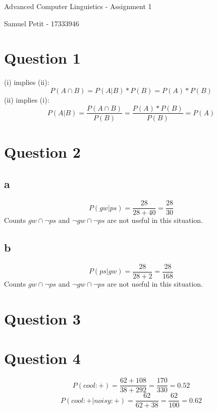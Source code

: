 \documentclass[10pt]{article}
\begin{document}
{\centering
    Advanced Computer Linguistics - Assignment 1
    \par
    Samuel Petit - 17333946
    \par
}
\section*{Question 1}
(i) implies (ii):
\begin{equation*}
    P(A \cap B) = P(A|B) * P(B) = P(A) * P(B)
\end{equation*}
(ii) implies (i):
\begin{equation*}
    P(A|B) = \frac{P(A \cap B)}{P(B)} = \frac{P(A) * P(B)}{P(B)} = P(A)
\end{equation*}

\section*{Question 2}
\subsection*{a}
\begin{equation*}
    P(gw|ps) = \frac{28}{28 + 40} = \frac{28}{30}
\end{equation*}
Counts $gw  \cap\neg ps$ and $\neg gw  \cap\neg ps$ are not useful in this situation.

\subsection*{b}
\begin{equation*}
    P(ps|gw) = \frac{28}{28 + 2} = \frac{28}{168}
\end{equation*}
Counts $gw  \cap\neg ps$ and $\neg gw  \cap\neg ps$ are not useful in this situation.

\section*{Question 3}
\section*{Question 4}
\begin{equation}
    P(cool: +) = \frac{62 + 108}{38 + 292} = \frac{170}{330} = 0.52
\end{equation}
\begin{equation}
    P(cool: +|noisy: +) = \frac{62}{62 + 38} = \frac{62}{100} = 0.62
\end{equation}
\end{document}
